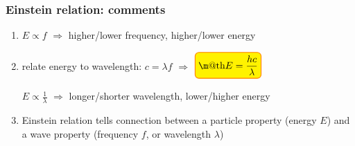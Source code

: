 \documentclass[12pt,xcolor=svgnames,handout]{beamer}
\makeatletter
\newcommand{\tightframetitle}[1]{ %
\frametitle{#1}\vspace{-.6\baselineskip}}
\renewcommand{\boxed}[1]{\textcolor{orange}{%
\tikz[baseline={([yshift=-1ex] current bounding box.center)}] \node [thick, rectangle, minimum width=1ex,rounded corners,fill=yellow, draw] {\normalcolor\m@th$\displaystyle#1$};}}
\makeatother
\begin{document}
\begin{frame}
\tightframetitle{Einstein relation: comments}

\begin{block}{}
\begin{enumerate}
\item $E \propto f$ $\Rightarrow$ higher/lower frequency, higher/lower energy

\item relate energy to wavelength: $c=\lambda f$ $\Rightarrow$ $\boxed{E=\frac{hc}{\lambda}}$

 $E \propto \frac{1}{\lambda}$ $\Rightarrow$ longer/shorter wavelength, lower/higher energy

\item Einstein relation tells connection between a particle property (energy $E$) and a wave property (frequency $f$, or wavelength $\lambda$)
\end{enumerate}
\end{block}

\end{frame}
\end{document}
